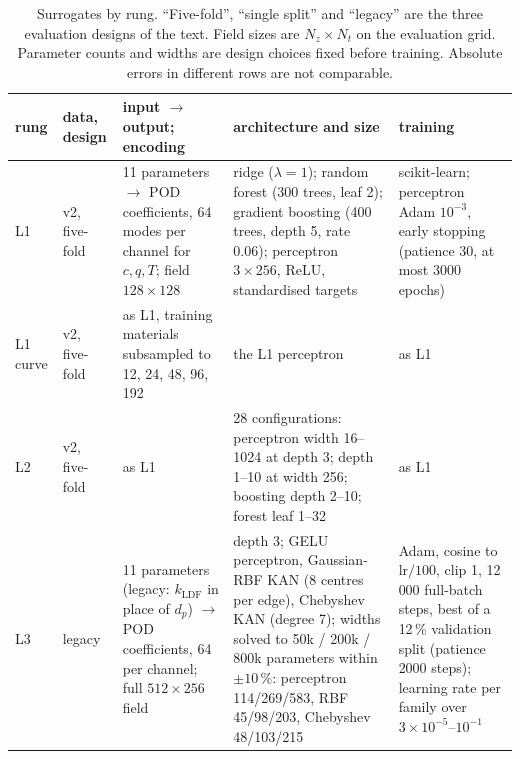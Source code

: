 \begin{table}[p]
\centering
\caption{Surrogates by rung. ``Five-fold'', ``single split'' and ``legacy'' are the
three evaluation designs of the text. Field sizes are \(N_z\times N_t\) on the
evaluation grid. Parameter counts and widths are design choices fixed before training.
Absolute errors in different rows are not comparable.}
\label{tab:rungs}
\footnotesize
\renewcommand{\arraystretch}{1.15}
\begin{tabular}{@{}p{}p{}p{}p{}p{}@{}}
\toprule
rung & data, design & input \(\to\) output; encoding & architecture and size & training \\
\midrule
L1 & v2, five-fold &
11 parameters \(\to\) POD coefficients, 64 modes per channel for \(c,q,T\); field \(128\times128\) &
ridge (\(\lambda=1\)); random forest (300 trees, leaf 2); gradient boosting (400 trees, depth 5, rate 0.06); perceptron \(3\times256\), ReLU, standardised targets &
scikit-learn; perceptron Adam \(10^{-3}\), early stopping (patience 30, at most 3000 epochs) \\
L1 curve & v2, five-fold & as L1, training materials subsampled to 12, 24, 48, 96, 192 & the L1 perceptron & as L1 \\
L2 & v2, five-fold & as L1 &
28 configurations: perceptron width 16--1024 at depth 3; depth 1--10 at width 256; boosting depth 2--10; forest leaf 1--32 & as L1 \\
L3 & legacy &
11 parameters (legacy: \(k_{\mathrm{LDF}}\) in place of \(d_p\)) \(\to\) POD coefficients, 64 per channel; full \(512\times256\) field &
depth 3; GELU perceptron, Gaussian-RBF KAN (8 centres per edge), Chebyshev KAN (degree 7); widths solved to 50k / 200k / 800k parameters within \(\pm10\,\%\): perceptron 114/269/583, RBF 45/98/203, Chebyshev 48/103/215 &
Adam, cosine to \(\mathrm{lr}/100\), clip 1, 12\,000 full-batch steps, best of a 12\,\% validation split (patience 2000 steps); learning rate per family over \(3\times10^{-5}\)--\(10^{-1}\) \\

\end{tabular}
\end{table}
